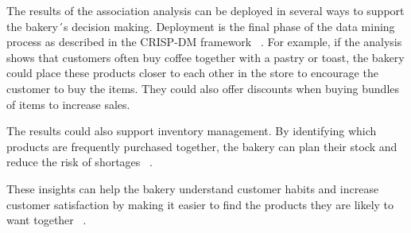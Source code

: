 \label{chap:deployment}
The results of the association analysis can be deployed in several ways to support the bakery´s decision making.
Deployment is the final phase of the data mining process as described in the CRISP-DM framework ~\cite{crispdm}.
For example, if the analysis shows that customers often buy coffee together with a pastry or toast, 
the bakery could place these products closer to each other in the store to encourage the customer to buy the items. 
They could also offer discounts when buying bundles of items to increase sales. 

The results could also support inventory management. By identifying which products are frequently purchased together, 
the bakery can plan their stock and reduce the risk of shortages ~\cite[Ch.~9]{courseLitt}.  

These insights can help the bakery understand customer habits and increase customer satisfaction by making 
it easier to find the products they are likely to want together ~\cite[Ch.~6]{BigData}. 

